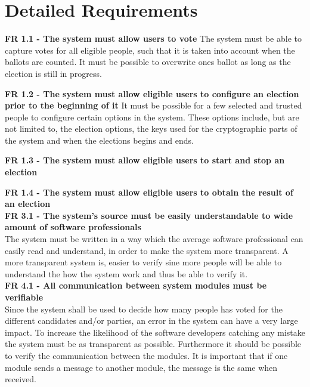 \chapter{Detailed Requirements}

\textbf{FR 1.1 - The system must allow users to vote} \bigskip
The system must be able to capture votes for all eligible people, such that it is taken into account when the ballots are counted. It must be possible to overwrite ones ballot as long as the election is still in progress.

\textbf{FR 1.2 - The system must allow eligible users to configure an election prior to the beginning of it} \bigskip
It must be possible for a few selected and trusted people to configure certain options in the system. These options include, but are not limited to, the election options, the keys used for the cryptographic parts of the system and when the elections begins and ends.

\textbf{FR 1.3 - The system must allow eligible users to start and stop an election}

\textbf{FR 1.4 - The system must allow eligible users to obtain the result of an election} \\

\textbf{FR 3.1 - The system's source must be easily understandable to wide amount of software professionals} \\
The system must be written in a way which the average software professional can easily read and understand, in order to make the system more transparent. A more transparent system is, easier to verify sine more people will be able to understand the how the system work and thus be able to verify it. \\


\textbf{FR 4.1 - All communication between system modules must be verifiable} \\
Since the system shall be used to decide how many people has voted for the different candidates and/or parties, an error in the system can have a very large impact. To increase the likelihood of the software developers catching any mistake the system must be as transparent as possible. Furthermore it should be possible to verify the communication between the modules. It is important that if one module sends a message to another module, the message is the same when received.